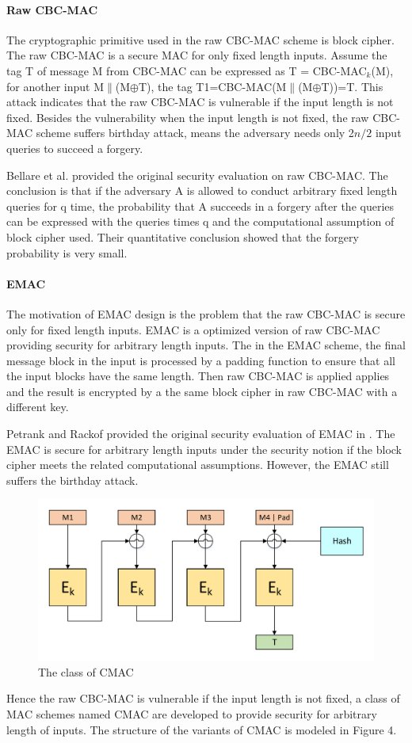 \documentclass{article}
\begin{document}
\paragraph{Raw CBC-MAC}
The cryptographic primitive used in the raw CBC-MAC scheme is block cipher.  
The raw CBC-MAC is a secure MAC for only fixed length inputs. Assume the tag T of message M from CBC-MAC can be expressed as T = CBC-MAC$_k$(M), for another input M$\|$(M$\oplus$T), the tag T1=CBC-MAC(M$\|$(M$\oplus$T))=T. This attack indicates that the raw CBC-MAC is vulnerable if the input length is not fixed.
Besides the vulnerability when the input length is not fixed, the raw CBC-MAC scheme suffers birthday attack, means the adversary needs only 2$n/2$ input queries to succeed a forgery. 

Bellare et al. provided the original security evaluation on raw CBC-MAC\cite{cbc1994}. The conclusion is that if the adversary A is allowed to conduct arbitrary fixed length queries for q time, the probability that A succeeds in a forgery after the queries can be expressed with the queries times q and the computational assumption of block cipher used. Their quantitative conclusion showed that the forgery probability is very small.
\paragraph{EMAC}
The motivation of EMAC design is the problem that the raw CBC-MAC is secure only for fixed length inputs. 
EMAC is a optimized version of raw CBC-MAC providing security for arbitrary length inputs. The in the EMAC scheme, the final message block in the input is processed by a padding function to ensure that all the input blocks have the same length. Then raw CBC-MAC is applied applies and the result is encrypted by a the same block cipher in raw CBC-MAC with a different key. 

Petrank and Rackof provided the original security evaluation of EMAC in \cite{emac}. The EMAC is secure for arbitrary length inputs under the security notion if the block cipher meets the related computational assumptions. However, the EMAC still suffers the birthday attack.
\begin{figure}[htbp]
\centering
\includegraphics[scale=0.5]{./diagrams/cmac.pdf}
\caption{The class of CMAC}
\label{CMAC }
\end{figure}
Hence the raw CBC-MAC is vulnerable if the input length is not fixed, a class of MAC schemes named CMAC are developed to provide security for arbitrary length of inputs. The structure of the  variants of CMAC is modeled in Figure 4.
\end{document}
